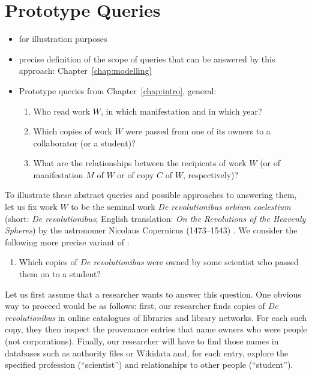 \chapter{Prototype Queries}
\label{chap:prototype_queries}

\begin{itemize}
  \item
    for illustration purposes
  \item
    precise definition of the scope of queries that can be answered by this approach: Chapter~\ref{chap:modelling}
  \item
    Prototype queries from Chapter~\ref{chap:intro}, general:
    \begin{enumerate}
      \item[\exaquery{1}]
        Who read work $W$, in which manifestation and in which year?
      \item[\exaquery{2}]
        Which copies of work $W$ were passed from one of its owners to a collaborator (or a student)?
      \item[\exaquery{3}]
        What are the relationships between the recipients of work $W$
        (or of manifestation $M$ of $W$ or of copy $C$ of $W$, respectively)?
    \end{enumerate}
\end{itemize}
%
To illustrate these abstract queries and possible approaches to answering them, let us fix work $W$ to be the seminal work \emph{De revolutionibus orbium coelestium}
(short: \emph{De revolutionibus}; English translation: \emph{On the Revolutions of the Heavenly Spheres}) by the astronomer Nicolaus Copernicus (1473–1543) \autocite{Kopernikus1543}.
We consider the following more precise variant of :
%
\begin{enumerate}
  \item[\exaquery{2$'$}]
    Which copies of \emph{De revolutionibus} were owned by some scientist who passed them on to a student?
\end{enumerate}
%
Let us first assume that a researcher wants to answer this question.
One obvious way to proceed would be as follows: first, our researcher finds copies of \emph{De revolutionibus} 
in online catalogues of libraries and library networks. For each such copy, they then inspect the provenance entries
that name owners who were people (not corporations). Finally, our researcher will have to find those names in databases such as
authority files or Wikidata and, for each entry, explore the specified profession (``scientist'') and relationships to other people (``student'').

